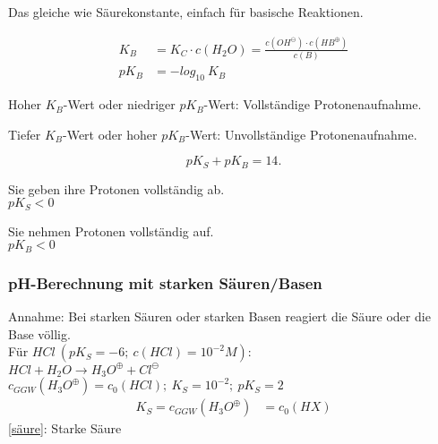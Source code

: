 \begin{definition}[Basenkonstante]
	Das gleiche wie Säurekonstante, einfach für basische Reaktionen.
	
	{\large
		\begin{equation}
		\begin{split}
		K_B & =K_C \cdot c(H_2O) = \frac{c(OH^\ominus) \cdot c(HB^\oplus)}{c(B)} \\
		pK_B & = -log_{10}\ K_B
		\end{split}
		\end{equation}
	}
	
	Hoher $K_B$-Wert oder niedriger $pK_B$-Wert: Vollständige Protonenaufnahme.
	
	Tiefer $K_B$-Wert oder hoher $pK_B$-Wert: Unvollständige Protonenaufnahme.
\end{definition}

{\large
\begin{equation}
	pK_S + pK_B = 14.
\end{equation}
}

\begin{definition}
	Sie geben ihre Protonen vollständig ab. \\
	{\large $pK_S < 0$}
\end{definition}

\begin{definition}
	Sie nehmen  Protonen vollständig auf. \\
	{\large $pK_B < 0$}
\end{definition}

\subsubsection{pH-Berechnung mit starken Säuren/Basen}

Annahme: Bei starken Säuren oder starken Basen reagiert die Säure oder die Base völlig. \\

Für $HCl\ (pK_S=-6; \ c(HCl) = 10^{-2} M)$:\\

$HCl + H_2O \rightarrow H_3O^\oplus + Cl^\ominus$\\

$c_{GGW}(H_3O^\oplus) = c_0(HCl); \ K_S = 10^{-2}; \ pK_S = 2$\\

{\large
	\begin{equation}
	\label{säure}
		\begin{split}
			 K_S=c_{GGW}(H_3O^\oplus) &= c_0(HX)
		\end{split}
	\end{equation}	
}
\ref{säure}: Starke Säure\\

